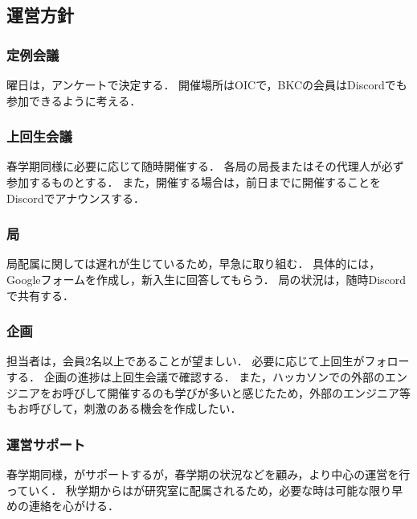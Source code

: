 \subsection*{運営方針}


\subsubsection*{定例会議}
曜日は，アンケートで決定する．
開催場所はOICで，BKCの会員はDiscordでも参加できるように考える．

\subsubsection*{上回生会議}
春学期同様に必要に応じて随時開催する．
各局の局長またはその代理人が必ず参加するものとする．
また，開催する場合は，前日までに開催することをDiscordでアナウンスする．


\subsubsection*{局}
局配属に関しては遅れが生じているため，早急に取り組む．
具体的には，Googleフォームを作成し，新入生に回答してもらう．
局の状況は，随時Discordで共有する．


\subsubsection*{企画}
担当者は，会員2名以上であることが望ましい．
必要に応じて上回生がフォローする．
企画の進捗は上回生会議で確認する．
また，ハッカソンでの外部のエンジニアをお呼びして開催するのも学びが多いと感じたため，外部のエンジニア等もお呼びして，刺激のある機会を作成したい．

\subsubsection*{運営サポート}
春学期同様，\thirdGrade{}がサポートするが，春学期の状況などを顧み，より\secondGrade{}中心の運営を行っていく．
秋学期からは\thirdGrade{}が研究室に配属されるため，必要な時は可能な限り早めの連絡を心がける．
